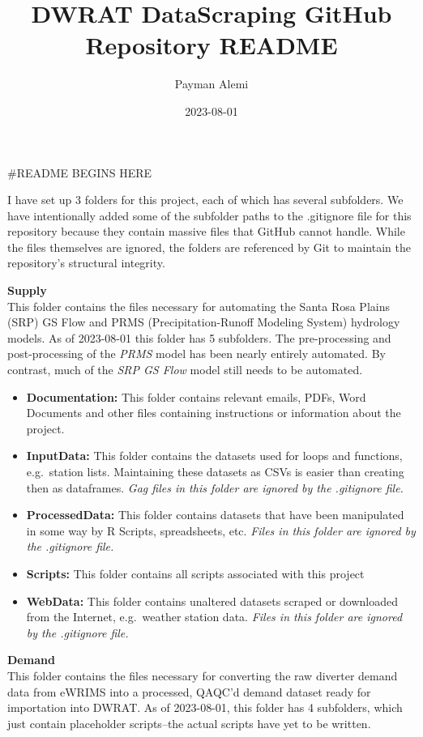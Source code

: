 \documentclass[
]{article}
\title{DWRAT DataScraping GitHub Repository README}
\author{Payman Alemi}
\date{2023-08-01}
\begin{document}
\maketitle

\#README BEGINS HERE

I have set up 3 folders for this project, each of which has several
subfolders. We have intentionally added some of the subfolder paths to
the .gitignore file for this repository because they contain massive
files that GitHub cannot handle. While the files themselves are ignored,
the folders are referenced by Git to maintain the repository's
structural integrity.

\textbf{Supply}\\
This folder contains the files necessary for automating the Santa Rosa
Plains (SRP) GS Flow and PRMS (Precipitation-Runoff Modeling System)
hydrology models. As of 2023-08-01 this folder has 5 subfolders. The
pre-processing and post-processing of the \emph{PRMS} model has been
nearly entirely automated. By contrast, much of the \emph{SRP GS Flow}
model still needs to be automated.

\begin{itemize}
\item
  \textbf{Documentation:} This folder contains relevant emails, PDFs,
  Word Documents and other files containing instructions or information
  about the project.
\item
  \textbf{InputData:} This folder contains the datasets used for loops
  and functions, e.g.~station lists. Maintaining these datasets as CSVs
  is easier than creating then as dataframes. \emph{Gag files in this
  folder are ignored by the .gitignore file.}
\item
  \textbf{ProcessedData:} This folder contains datasets that have been
  manipulated in some way by R Scripts, spreadsheets, etc. \emph{Files
  in this folder are ignored by the .gitignore file.}
\item
  \textbf{Scripts:} This folder contains all scripts associated with
  this project
\item
  \textbf{WebData:} This folder contains unaltered datasets scraped or
  downloaded from the Internet, e.g.~weather station data. \emph{Files
  in this folder are ignored by the .gitignore file.}
\end{itemize}

\textbf{Demand}\\
This folder contains the files necessary for converting the raw diverter
demand data from eWRIMS into a processed, QAQC'd demand dataset ready
for importation into DWRAT. As of 2023-08-01, this folder has 4
subfolders, which just contain placeholder scripts--the actual scripts
have yet to be written.
\end{document}
